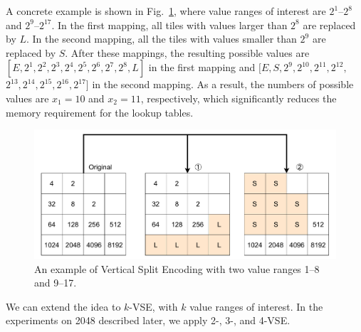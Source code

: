 A concrete example is shown in Fig.~\ref{fig:VSE-example}, where value ranges of interest are $2^1$--$2^8$ and $2^9$--$2^{17}$.
In the first mapping, all tiles with values larger than $2^{8}$ are replaced by $L$.
In the second mapping, all the tiles with values smaller than $2^{9}$ are replaced by $S$.
After these mappings, the resulting possible values are $[{E}, 2^1, 2^2, 2^3, 2^4, 2^5, 2^6, 2^7, 2^8, {L}]$ in the first mapping and $[{E}, {S}, 2^9, 2^{10}, 2^{11}, 2^{12}, $\break$2^{13}, 2^{14}, 2^{15}, 2^{16}, 2^{17}]$ in the second mapping.
As a result, the numbers of possible values are $x_1 = 10$ and $x_2 = 11$, respectively, which significantly reduces the memory requirement for the lookup tables.

\begin{figure}
 \includegraphics[width=.9\linewidth]{figures/VSE-example.pdf}
 \caption{An example of Vertical Split Encoding with two value ranges 1--8 and 9--17.}
 \label{fig:VSE-example}
\end{figure}


We can extend the idea to $k$-VSE, with $k$ value ranges of interest.
In the experiments on 2048 described later, we apply 2-, 3-, and 4-VSE.

